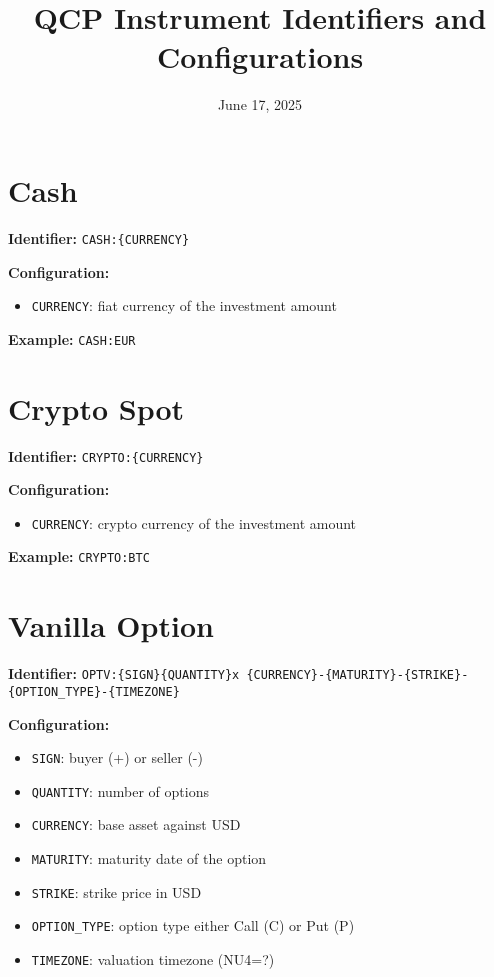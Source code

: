 \documentclass{article}
\title{QCP Instrument Identifiers and Configurations}
\date{June 17, 2025}
\begin{document}
\maketitle

\section{Cash}
\textbf{Identifier:} \texttt{CASH:\{CURRENCY\}}

\textbf{Configuration:}
\begin{itemize}
    \item \texttt{CURRENCY}: fiat currency of the investment amount
\end{itemize}

\textbf{Example:} \texttt{CASH:EUR}

\section{Crypto Spot}
\textbf{Identifier:} \texttt{CRYPTO:\{CURRENCY\}}

\textbf{Configuration:}
\begin{itemize}
    \item \texttt{CURRENCY}: crypto currency of the investment amount
\end{itemize}

\textbf{Example:} \texttt{CRYPTO:BTC}

\section{Vanilla Option}
\textbf{Identifier:} \texttt{OPTV:\{SIGN\}\{QUANTITY\}x \{CURRENCY\}-\{MATURITY\}-\{STRIKE\}-\{OPTION\_TYPE\}-\{TIMEZONE\}}

\textbf{Configuration:}
\begin{itemize}
    \item \texttt{SIGN}: buyer (+) or seller (-)
    \item \texttt{QUANTITY}: number of options
    \item \texttt{CURRENCY}: base asset against USD
    \item \texttt{MATURITY}: maturity date of the option
    \item \texttt{STRIKE}: strike price in USD
    \item \texttt{OPTION\_TYPE}: option type either Call (C) or Put (P)
    \item \texttt{TIMEZONE}: valuation timezone (NU4=?)
\end{itemize}
\end{document}
